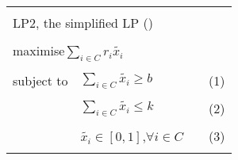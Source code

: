 \renewcommand{\arraystretch}{0.505}
\begin{tabularx}{\linewidth}{|lllr|}
    \hline
    & & &\tabularnewline
    \multicolumn{4}{|X|}{LP2, the simplified LP (\cite{bandyapadhyay_constant_2019})} \tabularnewline
    \hline
    & & &\tabularnewline
    \multicolumn{4}{|X|}{maximise\hphantom{.....}$\displaystyle \sum_{i\in C} r_{i}\tilde{x_i}$} \tabularnewline
    & & &\tabularnewline
    subject to & $\displaystyle \sum_{i\in C} \tilde{x_i}\geq b$ & &(1)\tabularnewline
    & & &\tabularnewline
    & $\displaystyle \sum_{i\in C} \tilde{x_i}\leq k$ & &(2)\tabularnewline
    & & &\tabularnewline
    \hphantom{.....}& $\tilde{x_i}\in [0,1]$,\hphantom{....}$\forall i\in C$ & &(3)\tabularnewline
    & & &\tabularnewline
    \hline
\end{tabularx}%
\renewcommand{\arraystretch}{1.0}
